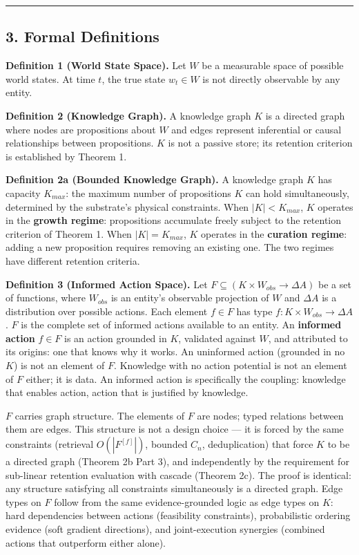 \documentclass[
]{article}
\begin{document}
\begin{center}\rule{0.5\linewidth}{0.5pt}\end{center}

\subsection{3. Formal Definitions}\label{formal-definitions}

\textbf{Definition 1 (World State Space).} Let \(W\) be a measurable
space of possible world states. At time \(t\), the true state
\(w_t \in W\) is not directly observable by any entity.

\textbf{Definition 2 (Knowledge Graph).} A knowledge graph \(K\) is a
directed graph where nodes are propositions about \(W\) and edges
represent inferential or causal relationships between propositions.
\(K\) is not a passive store; its retention criterion is established by
Theorem 1.

\textbf{Definition 2a (Bounded Knowledge Graph).} A knowledge graph
\(K\) has capacity \(K_{max}\): the maximum number of propositions \(K\)
can hold simultaneously, determined by the substrate's physical
constraints. When \(|K| < K_{max}\), \(K\) operates in the
\textbf{growth regime}: propositions accumulate freely subject to the
retention criterion of Theorem 1. When \(|K| = K_{max}\), \(K\) operates
in the \textbf{curation regime}: adding a new proposition requires
removing an existing one. The two regimes have different retention
criteria.

\textbf{Definition 3 (Informed Action Space).} Let
\(F \subseteq (K \times W_{obs} \to \Delta A)\) be a set of functions,
where \(W_{obs}\) is an entity's observable projection of \(W\) and
\(\Delta A\) is a distribution over possible actions. Each element
\(f \in F\) has type \(f : K \times W_{obs} \to \Delta A\). \(F\) is the
complete set of informed actions available to an entity. An
\textbf{informed action} \(f \in F\) is an action grounded in \(K\),
validated against \(W\), and attributed to its origins: one that knows
why it works. An uninformed action (grounded in no \(K\)) is not an
element of \(F\). Knowledge with no action potential is not an element
of \(F\) either; it is data. An informed action is specifically the
coupling: knowledge that enables action, action that is justified by
knowledge.

\(F\) carries graph structure. The elements of \(F\) are nodes; typed
relations between them are edges. This structure is not a design choice
--- it is forced by the same constraints (retrieval
\(O(|F^{[f]}|)\), bounded \(C_n\), deduplication) that force \(K\) to be
a directed graph (Theorem 2b Part 3), and independently by the
requirement for sub-linear retention evaluation with cascade (Theorem
2c). The proof is identical: any structure satisfying all constraints
simultaneously is a directed graph. Edge
types on \(F\) follow from the same evidence-grounded logic as edge
types on \(K\): hard dependencies between actions (feasibility
constraints), probabilistic ordering evidence (soft gradient
directions), and joint-execution synergies (combined actions that
outperform either alone).
\end{document}
